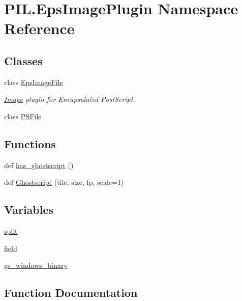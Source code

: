 \hypertarget{namespacePIL_1_1EpsImagePlugin}{}\section{P\+I\+L.\+Eps\+Image\+Plugin Namespace Reference}
\label{namespacePIL_1_1EpsImagePlugin}
\subsection*{Classes}
\begin{DoxyCompactItemize}
\item 
class \hyperlink{classPIL_1_1EpsImagePlugin_1_1EpsImageFile}{Eps\+Image\+File}
\begin{DoxyCompactList}\small\item\em \hyperlink{namespacePIL_1_1Image}{Image} plugin for Encapsulated Post\+Script. \end{DoxyCompactList}\item 
class \hyperlink{classPIL_1_1EpsImagePlugin_1_1PSFile}{P\+S\+File}
\end{DoxyCompactItemize}
\subsection*{Functions}
\begin{DoxyCompactItemize}
\item 
def \hyperlink{namespacePIL_1_1EpsImagePlugin_ac79d0a396177e8b70c73daff0ce0f643}{has\+\_\+ghostscript} ()
\item 
def \hyperlink{namespacePIL_1_1EpsImagePlugin_a6738af9eac336dffc0940d3678f51f73}{Ghostscript} (tile, size, fp, scale=1)
\end{DoxyCompactItemize}
\subsection*{Variables}
\begin{DoxyCompactItemize}
\item 
\hyperlink{namespacePIL_1_1EpsImagePlugin_a15c28c754e94920d11e8bd2dd9649737}{split}
\item 
\hyperlink{namespacePIL_1_1EpsImagePlugin_a50be947ea5f8515eb46df3e5e6139e52}{field}
\item 
\hyperlink{namespacePIL_1_1EpsImagePlugin_aa8585827ffa54e7dd6b31e5d87e95cbc}{gs\+\_\+windows\+\_\+binary}
\end{DoxyCompactItemize}


\subsection{Function Documentation}
\mbox{\label{namespacePIL_1_1EpsImagePlugin_a6738af9eac336dffc0940d3678f51f73}} 

